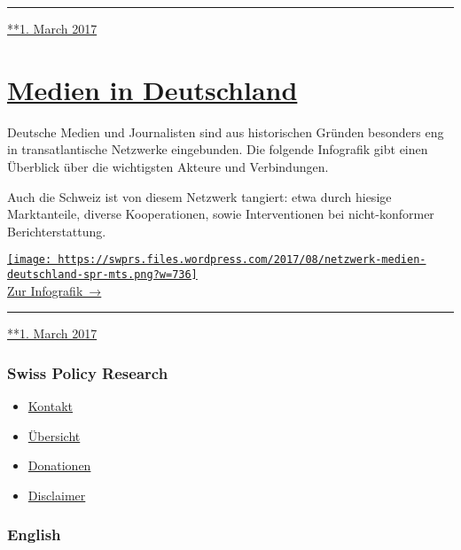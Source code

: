 \begin{center}\rule{0.5\linewidth}{\linethickness}\end{center}

\href{https://swprs.org/2017/03/01/propaganda-im-staatsauftrag/}{**1.
March 2017}

\hypertarget{medien-in-deutschland}{%
\section{\texorpdfstring{\href{https://swprs.org/2017/03/01/medien-in-deutschland/}{Medien
in Deutschland}}{Medien in Deutschland}}\label{medien-in-deutschland}}

Deutsche Medien und Journalisten sind aus historischen Gründen besonders
eng in trans­at­lan­tische Netz­werke eingebunden. Die folgende
Info­grafik gibt einen Über­blick über die wich­tigsten Akteure und
Ver­bindungen.

Auch die Schweiz ist von diesem Netzwerk tangiert: etwa durch hiesige
Marktanteile, diverse Kooperationen, sowie Interventionen bei
nicht-konformer Berichterstattung.

\href{https://swprs.org/netzwerk-medien-deutschland/}{\texttt{[image: https://swprs.files.wordpress.com/2017/08/netzwerk-medien-deutschland-spr-mts.png?w=736]}\\
Zur Infografik~→}

\begin{center}\rule{0.5\linewidth}{\linethickness}\end{center}

\href{https://swprs.org/2017/03/01/medien-in-deutschland/}{**1. March
2017}

\hypertarget{swiss-policy-research}{%
\subsubsection{Swiss Policy Research}\label{swiss-policy-research}}

\begin{itemize}
\tightlist
\item
  \href{https://swprs.org/kontakt/}{Kontakt}
\item
  \href{https://swprs.org/uebersicht/}{Übersicht}
\item
  \href{https://swprs.org/donationen/}{Donationen}
\item
  \href{https://swprs.org/disclaimer/}{Disclaimer}
\end{itemize}

\hypertarget{english}{%
\subsubsection{English}\label{english}}

